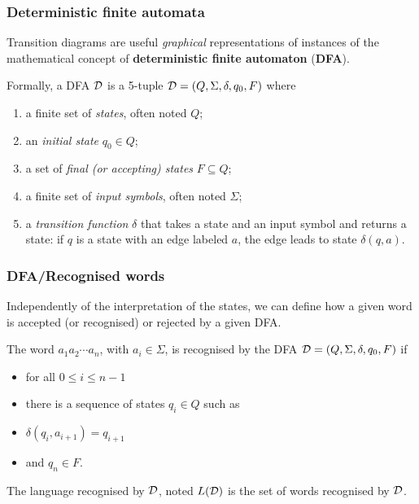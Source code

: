 
%
\begin{frame}
\frametitle{Deterministic finite automata}

Transition diagrams are useful \emph{graphical} representations of
instances of the mathematical concept of \textbf{deterministic finite
automaton} (\textbf{DFA}).

\bigskip

Formally, a DFA \({\cal D}\) is a 5-tuple \({\cal D} = (Q, \Sigma,
\delta, q_0, F)\) where
\begin{enumerate}

  \item a finite set of \emph{states}, often noted \(Q\);

  \item an \emph{initial state} \(q_0 \in Q\);

  \item a set of \emph{final (\emph{or} accepting)
  states} \(F \subseteq Q\);

  \item a finite set of \emph{input symbols}, often noted \(\Sigma\);

  \item a \emph{transition function} \(\delta\) that takes
  a state and an input symbol and returns a state: if \(q\) is a state
  with an edge labeled \(a\), the edge leads to state \(\delta(q,
  a)\).

\end{enumerate}

\end{frame}

%
\begin{frame}
\frametitle{DFA/Recognised words}

Independently of the interpretation of the states, we can define how a
given word is accepted (or recognised) or rejected by a given DFA.

\bigskip

\noindent The word \(a_1 a_2 \cdots a_n\), with \(a_i \in \Sigma\), is
recognised by the DFA \({\cal D} = (Q, \Sigma, \delta, q_0, F)\) if
\begin{itemize}

  \item for all \(0 \leqslant i \leqslant n-1\)

  \item there is a sequence of states \(q_i \in Q\) such as

  \item \(\delta (q_i, a_{i+1}) = q_{i+1}\)

  \item and \(q_n \in F\).

\end{itemize}
The language recognised by \(\cal D\), noted \(L({\cal D})\) is the
set of words recognised by \(\cal D\).

\end{frame}

